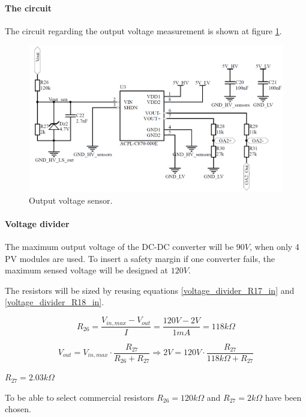 \paragraph{The circuit}
The circuit regarding the output voltage measurement is shown at figure \ref{fig:output_voltage_sensor_circuit}. 

\begin{figure}[H]
	\begin{center}
		\includegraphics[width=0.8\linewidth]{../Pictures/P1/Sensors/output_voltage_sensor.PNG}
		\caption{Output voltage sensor.}
		\label{fig:output_voltage_sensor_circuit}
	\end{center}
\end{figure}

\paragraph{Voltage divider}
The maximum output voltage of the DC-DC converter will be $90V$, when only 4 PV modules are used. To insert a safety margin if one converter fails, the maximum sensed voltage will be designed at $120V$.

\noindent The resistors will be sized by reusing equations \ref{voltage_divider_R17_in} and \ref{voltage_divider_R18_in}.

\begin{equation}
	R_{26} = \frac{V_{in,max}-V_{out}}{I} = \frac{120V-2V}{1mA} = 118k\Omega	
\end{equation}

\begin{equation} 
	V_{out} = V_{in,max} \cdot \frac{R_{27}}{R_{26}+R_{27}} \Rightarrow 2V = 120V \cdot \frac{R_{27}}{118k\Omega+R_{27}}
\end{equation}
\begin{center}
	$R_{27} = 2.03k\Omega$
\end{center}

\noindent To be able to select commercial resistors $R_{26} = 120k\Omega$ and $R_{27} = 2k\Omega$ have been chosen. 

